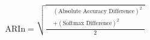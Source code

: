 \begin{multline}
\text{ARIn} = \sqrt{\frac{\begin{aligned} &\left(\text{Absolute Accuracy Difference}\right)^2 \\ &+ \left(\text{Softmax Difference}\right)^2 \end{aligned}}{2}}
\label{eq:ARIn}
\end{multline}






